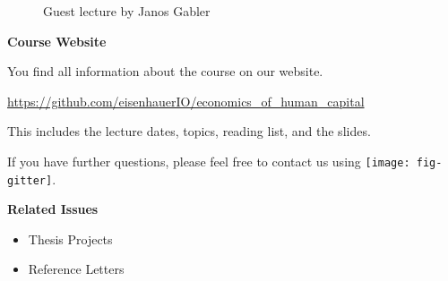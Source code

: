 \begin{frame}
	\begin{figure}
		\caption{Guest lecture by Janos Gabler}
		\centering{}
	\end{figure}
\end{frame}
\begin{frame}
	\textbf{Course Website}\vspace{0.3cm}

You find all information about the course on our website.

\begin{center}
\url{https://github.com/eisenhauerIO/economics_of_human_capital}
\end{center}

This includes the lecture dates, topics, reading list, and the slides.\vspace{0.3cm}

If you have further questions, please feel free to contact us using
\texttt{[image: fig-gitter]}.

\end{frame}
\begin{frame}
	\textbf{Related Issues}\vspace{0.3cm}

	\begin{itemize}\setlength\itemsep{1em}
	\item Thesis Projects
	\item Reference Letters
	\end{itemize}
\end{frame}
